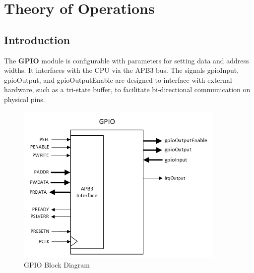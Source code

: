 \section{Theory of Operations}

\subsection{Introduction}
The \textbf{GPIO} module is configurable with parameters for setting data and address widths. It interfaces with the CPU via the APB3 bus. The signals gpioInput, gpioOutput, and gpioOutputEnable are designed to interface with external hardware, such as a tri-state buffer, to facilitate bi-directional communication on physical pins.

\begin{figure}[h]
  \includegraphics[width=0.90\textwidth]{images/block-diagram-gpio.png}
  \caption{GPIO Block Diagram}\label{fig:block-diagram}
\end{figure}




